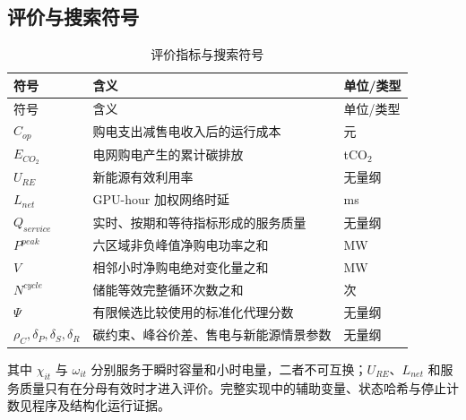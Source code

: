 \documentclass[withoutpreface,bwprint]{cumcmthesis}
\begin{document}
\subsection{评价与搜索符号}
\begin{longtable}{p{}p{}p{}}
\caption{评价指标与搜索符号}\label{tab:symbol-metric}\\
\toprule 符号 & 含义 & 单位/类型\\ \midrule\endfirsthead
\toprule 符号 & 含义 & 单位/类型\\ \midrule\endhead
\bottomrule\endfoot
$C_{op}$ & 购电支出减售电收入后的运行成本 & 元\\
$E_{CO_2}$ & 电网购电产生的累计碳排放 & tCO$_2$\\
$U_{RE}$ & 新能源有效利用率 & 无量纲\\
$L_{net}$ & GPU-hour 加权网络时延 & ms\\
$Q_{service}$ & 实时、按期和等待指标形成的服务质量 & 无量纲\\
$P^{peak}$ & 六区域非负峰值净购电功率之和 & MW\\
$V$ & 相邻小时净购电绝对变化量之和 & MW\\
$N^{cycle}$ & 储能等效完整循环次数之和 & 次\\
$\Psi$ & 有限候选比较使用的标准化代理分数 & 无量纲\\
$\rho_C,\delta_P,\delta_S,\delta_R$ & 碳约束、峰谷价差、售电与新能源情景参数 & 无量纲\\
\end{longtable}

其中 $\chi_{it}$ 与 $\omega_{it}$ 分别服务于瞬时容量和小时电量，二者不可互换；$U_{RE}$、$L_{net}$ 和服务质量只有在分母有效时才进入评价。完整实现中的辅助变量、状态哈希与停止计数见程序及结构化运行证据。

\end{document}
